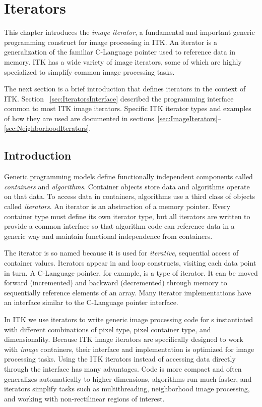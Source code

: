 \chapter{Iterators}
\label{sec:ImageIteratorsChapter}
This chapter introduces the \emph{image iterator}, a fundamental and important
generic programming construct for image processing in ITK.  An iterator is a
generalization of the familiar C-Language pointer used to reference data in
memory.  ITK has a wide variety of image iterators, some of which are highly
specialized to simplify common image processing tasks.

The next section is a brief introduction that defines iterators in the context
of ITK.  Section ~\ref{sec:IteratorsInterface} described the programming
interface common to most ITK image iterators.  Specific ITK iterator types and
examples of how they are used are documented in
sections~\ref{sec:ImageIterators}--\ref{sec:NeighborhoodIterators}.

\section{Introduction}
\label{sec:IteratorsIntroduction}
Generic programming models define functionally independent components called
\emph{containers} and \emph{algorithms}.  Container objects store data and
algorithms operate on that data.  To access data in containers, algorithms use
a third class of objects called \emph{iterators}.  An iterator is an
abstraction of a memory pointer.  Every container type must define its own
iterator type, but all iterators are written to provide a common interface so that
algorithm code can reference data in a generic way and
maintain functional independence from containers.

The iterator is so named because it is used for \emph{iterative}, sequential
access of container values.  Iterators appear in  and
 loop constructs, visiting each data point in turn.  A C-Language pointer,
for example, is a type of iterator.  It can be moved forward (incremented) and
backward (decremented) through memory to sequentially reference elements of an
array. Many iterator implementations have an interface similar to the
C-Language pointer interface. 

In ITK we use iterators to write generic image processing code for
s instantiated with different combinations of pixel type, pixel
container type, and dimensionality.  Because ITK image iterators are
specifically designed to work with \emph{image} containers, their interface and
implementation is optimized for image processing tasks.  Using the ITK
iterators instead of accessing data directly through the
 interface has many advantages. Code is more
compact and often generalizes automatically to higher dimensions, algorithms
run much faster, and iterators simplify tasks such as multithreading,
neighborhood image processing, and working with non-rectilinear regions of
interest.


